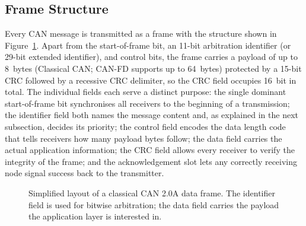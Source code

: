 \documentclass[11pt,a4paper,oneside,parskip=half]{scrreprt}
\begin{document}
\subsection{Frame Structure}
Every CAN message is transmitted as a frame with the structure shown in Figure~\ref{fig:can_frame}. Apart from the start-of-frame bit, an 11-bit arbitration identifier (or 29-bit extended identifier), and control bits, the frame carries a payload of up to 8~bytes (Classical CAN; CAN-FD supports up to 64~bytes) protected by a 15-bit CRC followed by a recessive CRC delimiter, so the CRC field occupies 16~bit in total. The individual fields each serve a distinct purpose: the single dominant start-of-frame bit synchronises all receivers to the beginning of a transmission; the identifier field both names the message content and, as explained in the next subsection, decides its priority; the control field encodes the data length code that tells receivers how many payload bytes follow; the data field carries the actual application information; the CRC field allows every receiver to verify the integrity of the frame; and the acknowledgement slot lets any correctly receiving node signal success back to the transmitter.

\begin{figure}[H]
\centering
{}
\caption{Simplified layout of a classical CAN 2.0A data frame. The identifier field is used for bitwise arbitration; the data field carries the payload the application layer is interested in.}
\label{fig:can_frame}
\end{figure}
\end{document}
